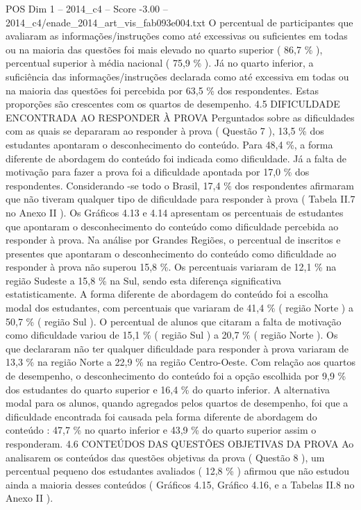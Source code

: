 \begin{textsample}{POS Dim 1 – 2014\_c4 – Score -3.00 – 2014\_c4/enade\_2014\_art\_vis\_fab093e004.txt}
O percentual de participantes que avaliaram as informações/instruções como até excessivas ou suficientes em todas ou na maioria das questões foi mais elevado no quarto superior ( 86,7 \% ), percentual superior à média nacional ( 75,9 \% ).
Já no quarto inferior, a suficiência das informações/instruções declarada como até excessiva em todas ou na maioria das questões foi percebida por 63,5 \% dos respondentes.
Estas proporções são crescentes com os quartos de desempenho. 4.5 DIFICULDADE ENCONTRADA AO RESPONDER À PROVA Perguntados sobre as dificuldades com as quais se depararam ao responder à prova ( Questão 7 ), 13,5 \% dos estudantes apontaram o desconhecimento do conteúdo.
Para 48,4 \%, a forma diferente de abordagem do conteúdo foi indicada como dificuldade.
Já a falta de motivação para fazer a prova foi a dificuldade apontada por 17,0 \% dos respondentes.
Considerando -se todo o Brasil, 17,4 \% dos respondentes afirmaram que não tiveram qualquer tipo de dificuldade para responder à prova ( Tabela II.7 no Anexo II ).
Os Gráficos 4.13 e 4.14 apresentam os percentuais de estudantes que apontaram o desconhecimento do conteúdo como dificuldade percebida ao responder à prova.
Na análise por Grandes Regiões, o percentual de inscritos e presentes que apontaram o desconhecimento do conteúdo como dificuldade ao responder à prova não superou 15,8 \%.
Os percentuais variaram de 12,1 \% na região Sudeste a 15,8 \% na Sul, sendo esta diferença significativa estatisticamente.
A forma diferente de abordagem do conteúdo foi a escolha modal dos estudantes, com percentuais que variaram de 41,4 \% ( região Norte ) a 50,7 \% ( região Sul ).
O percentual de alunos que citaram a falta de motivação como dificuldade variou de 15,1 \% ( região Sul ) a 20,7 \% ( região Norte ).
Os que declararam não ter qualquer dificuldade para responder à prova variaram de 13,3 \% na região Norte a 22,9 \% na região Centro-Oeste.
Com relação aos quartos de desempenho, o desconhecimento do conteúdo foi a opção escolhida por 9,9 \% dos estudantes do quarto superior e 16,4 \% do quarto inferior.
A alternativa modal para os alunos, quando agregados pelos quartos de desempenho, foi que a dificuldade encontrada foi causada pela forma diferente de abordagem do conteúdo : 47,7 \% no quarto inferior e 43,9 \% do quarto superior assim o responderam. 4.6 CONTEÚDOS DAS QUESTÕES OBJETIVAS DA PROVA Ao analisarem os conteúdos das questões objetivas da prova ( Questão 8 ), um percentual pequeno dos estudantes avaliados ( 12,8 \% ) afirmou que não estudou ainda a maioria desses conteúdos ( Gráficos 4.15, Gráfico 4.16, e a Tabelas II.8 no Anexo II ).

\end{textsample}
